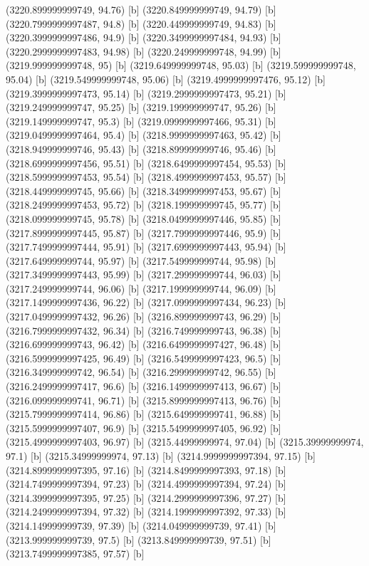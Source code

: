 {{{(3220.899999999749, 94.76) [b] 
(3220.849999999749, 94.79) [b] 
(3220.7999999997487, 94.8) [b] 
(3220.449999999749, 94.83) [b] 
(3220.3999999997486, 94.9) [b] 
(3220.3499999997484, 94.93) [b] 
(3220.2999999997483, 94.98) [b] 
(3220.249999999748, 94.99) [b] 
(3219.999999999748, 95) [b] 
(3219.649999999748, 95.03) [b] 
(3219.599999999748, 95.04) [b] 
(3219.549999999748, 95.06) [b] 
(3219.4999999997476, 95.12) [b] 
(3219.3999999997473, 95.14) [b] 
(3219.2999999997473, 95.21) [b] 
(3219.249999999747, 95.25) [b] 
(3219.199999999747, 95.26) [b] 
(3219.149999999747, 95.3) [b] 
(3219.0999999997466, 95.31) [b] 
(3219.0499999997464, 95.4) [b] 
(3218.9999999997463, 95.42) [b] 
(3218.949999999746, 95.43) [b] 
(3218.899999999746, 95.46) [b] 
(3218.6999999997456, 95.51) [b] 
(3218.6499999997454, 95.53) [b] 
(3218.5999999997453, 95.54) [b] 
(3218.4999999997453, 95.57) [b] 
(3218.449999999745, 95.66) [b] 
(3218.3499999997453, 95.67) [b] 
(3218.2499999997453, 95.72) [b] 
(3218.199999999745, 95.77) [b] 
(3218.099999999745, 95.78) [b] 
(3218.0499999997446, 95.85) [b] 
(3217.8999999997445, 95.87) [b] 
(3217.7999999997446, 95.9) [b] 
(3217.7499999997444, 95.91) [b] 
(3217.6999999997443, 95.94) [b] 
(3217.649999999744, 95.97) [b] 
(3217.549999999744, 95.98) [b] 
(3217.3499999997443, 95.99) [b] 
(3217.299999999744, 96.03) [b] 
(3217.249999999744, 96.06) [b] 
(3217.199999999744, 96.09) [b] 
(3217.1499999997436, 96.22) [b] 
(3217.0999999997434, 96.23) [b] 
(3217.0499999997432, 96.26) [b] 
(3216.899999999743, 96.29) [b] 
(3216.7999999997432, 96.34) [b] 
(3216.749999999743, 96.38) [b] 
(3216.699999999743, 96.42) [b] 
(3216.6499999997427, 96.48) [b] 
(3216.5999999997425, 96.49) [b] 
(3216.5499999997423, 96.5) [b] 
(3216.349999999742, 96.54) [b] 
(3216.299999999742, 96.55) [b] 
(3216.2499999997417, 96.6) [b] 
(3216.1499999997413, 96.67) [b] 
(3216.099999999741, 96.71) [b] 
(3215.8999999997413, 96.76) [b] 
(3215.7999999997414, 96.86) [b] 
(3215.649999999741, 96.88) [b] 
(3215.5999999997407, 96.9) [b] 
(3215.5499999997405, 96.92) [b] 
(3215.4999999997403, 96.97) [b] 
(3215.44999999974, 97.04) [b] 
(3215.39999999974, 97.1) [b] 
(3215.34999999974, 97.13) [b] 
(3214.9999999997394, 97.15) [b] 
(3214.8999999997395, 97.16) [b] 
(3214.8499999997393, 97.18) [b] 
(3214.7499999997394, 97.23) [b] 
(3214.4999999997394, 97.24) [b] 
(3214.3999999997395, 97.25) [b] 
(3214.2999999997396, 97.27) [b] 
(3214.2499999997394, 97.32) [b] 
(3214.1999999997392, 97.33) [b] 
(3214.149999999739, 97.39) [b] 
(3214.049999999739, 97.41) [b] 
(3213.999999999739, 97.5) [b] 
(3213.849999999739, 97.51) [b] 
(3213.7499999997385, 97.57) [b] 
}}}
